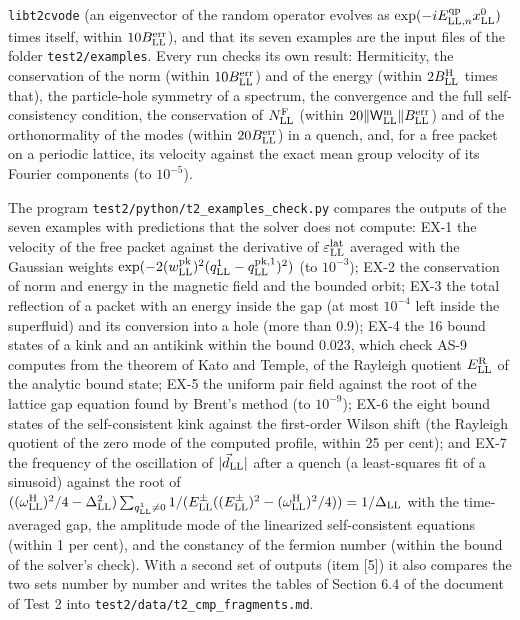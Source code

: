 \documentclass[
  10pt,
]{article}
\begin{document}
\texttt{libt2cvode} (an eigenvector of the random operator evolves as
\(\exp(-iE^{\rm qp}_{{\rm LL},n}x^0_{\rm LL})\) times itself, within
\(10B^{\rm err}_{\rm LL}\)), and that its seven examples are the input
files of the folder \texttt{test2/examples}. Every run checks its own
result: Hermiticity, the conservation of the norm (within
\(10B^{\rm err}_{\rm LL}\)) and of the energy (within
\(2B^{\rm H}_{\rm LL}\) times that), the particle-hole symmetry of a
spectrum, the convergence and the full self-consistency condition, the
conservation of \(N^{\rm F}_{\rm LL}\) (within
\(20\lVert\mathsf W^{\rm m}_{\rm LL}\rVert B^{\rm err}_{\rm LL}\)) and
of the orthonormality of the modes (within \(20B^{\rm err}_{\rm LL}\))
in a quench, and, for a free packet on a periodic lattice, its velocity
against the exact mean group velocity of its Fourier components (to
\(10^{-5}\)).

The program \texttt{test2/python/t2\_examples\_check.py} compares the
outputs of the seven examples with predictions that the solver does not
compute: EX-1 the velocity of the free packet against the derivative of
\(\varepsilon^{\rm lat}_{\rm LL}\) averaged with the Gaussian weights
\(\exp(-2(w^{\rm pk}_{\rm LL})^2(q^1_{\rm LL}-q^{{\rm pk},1}_{\rm LL})^2)\)
(to \(10^{-3}\)); EX-2 the conservation of norm and energy in the
magnetic field and the bounded orbit; EX-3 the total reflection of a
packet with an energy inside the gap (at most \(10^{-4}\) left inside
the superfluid) and its conversion into a hole (more than 0.9); EX-4 the
16 bound states of a kink and an antikink within the bound 0.023, which
check AS-9 computes from the theorem of Kato and Temple, of the Rayleigh
quotient \(E^{\rm R}_{\rm LL}\) of the analytic bound state; EX-5 the
uniform pair field against the root of the lattice gap equation found by
Brent's method (to \(10^{-9}\)); EX-6 the eight bound states of the
self-consistent kink against the first-order Wilson shift (the Rayleigh
quotient of the zero mode of the computed profile, within 25 per cent);
and EX-7 the frequency of the oscillation of
\(\lvert\vec d_{\rm LL}\rvert\) after a quench (a least-squares fit of a
sinusoid) against the root of
\(((\omega^{\rm H}_{\rm LL})^2/4-\Delta_{\rm LL}^2)\sum_{q^1_{\rm LL}\neq0}1/(E^\pm_{\rm LL}((E^\pm_{\rm LL})^2-(\omega^{\rm H}_{\rm LL})^2/4))=1/\Delta_{\rm LL}\)
with the time-averaged gap, the amplitude mode of the linearized
self-consistent equations (within 1 per cent), and the constancy of the
fermion number (within the bound of the solver's check). With a second
set of outputs (item {[}5{]}) it also compares the two sets number by
number and writes the tables of Section 6.4 of the document of Test 2
into \texttt{test2/data/t2\_cmp\_fragments.md}.
\end{document}
